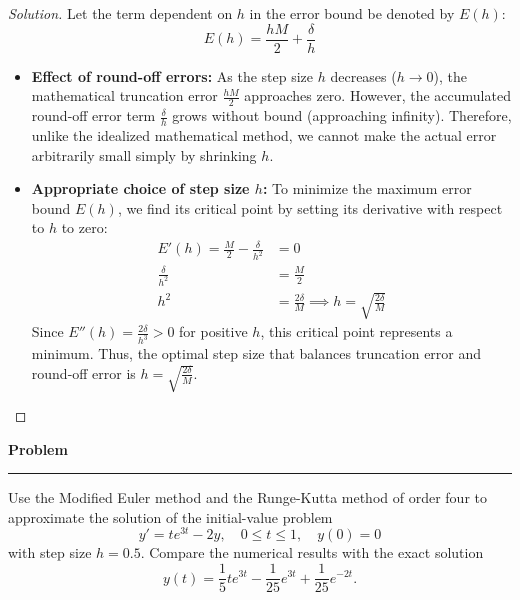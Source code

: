 \documentclass[11pt, a4paper]{article}
\newenvironment{problem}{%
  \begin{tcolorbox}[
    colback=blue!4!white,
    colframe=blue!38!black,
    boxrule=0.95pt,
    arc=3pt,
    left=11pt,
    right=11pt,
    top=10pt,
    bottom=11pt,
    before skip=12pt,
    after skip=14pt,
  ]
  \noindent\textbf{\textcolor{blue!35!black}{Problem}}\par\nointerlineskip
  {\color{blue!42!black}\rule{\linewidth}{0.55pt}}\par\vspace{0.55em}%
}{%
  \end{tcolorbox}%
}
\newif\ifsolutionnewpage
\newenvironment{solution}
  {\begin{proof}[Solution]}
  {\end{proof}\ifsolutionnewpage\newpage\fi}
\begin{document}
\begin{solution}
    Let the term dependent on $h$ in the error bound be denoted by $E(h)$:
    \begin{equation*}
    E(h) = \frac{hM}{2} + \frac{\delta}{h}
    \end{equation*}
    \begin{itemize}
        \item \textbf{Effect of round-off errors:} As the step size $h$ decreases ($h \to 0$), the mathematical truncation error $\frac{hM}{2}$ approaches zero. However, the accumulated round-off error term $\frac{\delta}{h}$ grows without bound (approaching infinity). Therefore, unlike the idealized mathematical method, we cannot make the actual error arbitrarily small simply by shrinking $h$.
        \item \textbf{Appropriate choice of step size $h$:} To minimize the maximum error bound $E(h)$, we find its critical point by setting its derivative with respect to $h$ to zero:
        \begin{align*}
        E'(h) = \frac{M}{2} - \frac{\delta}{h^2} &= 0 \\
        \frac{\delta}{h^2} &= \frac{M}{2} \\
        h^2 &= \frac{2\delta}{M} \implies h = \sqrt{\frac{2\delta}{M}}
        \end{align*}
        Since $E''(h) = \frac{2\delta}{h^3} > 0$ for positive $h$, this critical point represents a minimum. Thus, the optimal step size that balances truncation error and round-off error is $h = \sqrt{\frac{2\delta}{M}}$.
    \end{itemize}
    \end{solution}

    
    \begin{problem}
        Use the Modified Euler method and the Runge-Kutta method of order four to approximate the solution of the initial-value problem
        \begin{equation*}
        y' = te^{3t} - 2y, \quad 0 \le t \le 1, \quad y(0) = 0
        \end{equation*}
        with step size $h = 0.5$. Compare the numerical results with the exact solution
        \begin{equation*}
        y(t) = \frac{1}{5}te^{3t} - \frac{1}{25}e^{3t} + \frac{1}{25}e^{-2t}.
        \end{equation*}
        \end{problem}
        
\end{document}
